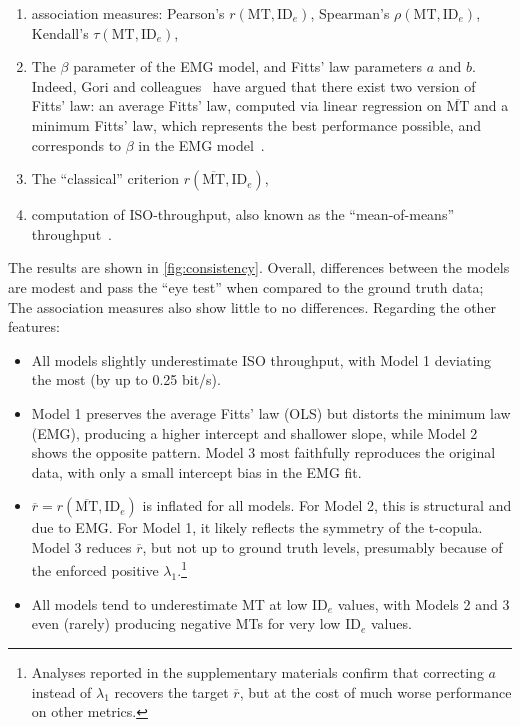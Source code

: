 \documentclass[acmlarge, manuscript,review]{acmart}
\newcommand{\mmt}{\ensuremath{\overline{\mt}}\xspace}
\newcommand{\mt}{\ensuremath{{\text{MT}}}\xspace}
\newcommand{\ide}{\ensuremath{{\text{ID}_e}}\xspace}
\begin{document}
\begin{enumerate}
	\item association measures: Pearson's $r(\mt, \ide)$, Spearman's $\rho(\mt, \ide)$, Kendall's $\tau(\mt, \ide)$,
	\item The $\beta$ parameter of the EMG model, and Fitts' law parameters $a$ and $b$. Indeed, Gori and colleagues~\cite{gori2017,gori2018tochi} have argued that there exist two version of Fitts' law: an average Fitts' law, computed via linear regression on \mmt and a minimum Fitts' law, which represents the best performance possible, and corresponds to $\beta$ in the EMG model~\cite{gori2019}.
	\item The ``classical'' criterion $r(\overline{\mt}, \ide)$,
	\item computation of ISO-throughput, also known as the ``mean-of-means'' throughput~\cite{soukoreff2004}.
\end{enumerate}

The results are shown in \autoref{fig:consistency}. Overall, differences between the models are modest and pass the ``eye test'' when compared to the ground truth data; The association measures also show little to no differences. Regarding the other features:
\begin{itemize}
	\item All models slightly underestimate ISO throughput, with Model 1 deviating the most (by up to 0.25 bit/s). 
	\item Model 1 preserves the average Fitts' law (OLS) but distorts the minimum law (EMG), producing a higher intercept and shallower slope, while Model 2 shows the opposite pattern. Model 3 most faithfully reproduces the original data, with only a small intercept bias in the EMG fit.
	\item $\overline{r} = r(\mmt, \ide)$ is inflated for all models. For Model 2, this is structural and due to EMG. For Model 1, it likely reflects the symmetry of the t-copula. Model 3 reduces $\overline{r}$, but not up to ground truth levels, presumably because of the enforced positive $\lambda_1$.\footnote{Analyses reported in the supplementary materials confirm that correcting $a$ instead of $\lambda_1$ recovers the target $\overline{r}$, but at the cost of much worse performance on other metrics.}
	\item All models tend to underestimate MT at low \ide values, with Models 2 and 3 even (rarely) producing negative MTs for very low \ide values.
\end{itemize}
\end{document}
